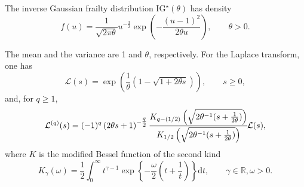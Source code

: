 The inverse Gaussian frailty distribution $\mathrm{IG}^\star(\theta)$ has density
\begin{equation*} 
  f(u) = \frac1{\sqrt{2 \pi \theta}} u^{- \tfrac32} \exp \left( - \frac{(u-1)^2}{2 \theta u}  \right),
  \qquad \theta > 0.
\end{equation*}

The mean and the variance are 1 and $\theta$, respectively.
For the Laplace transform, one has
\begin{equation*}
  \mathcal L(s) = \exp \left( \frac1\theta \left(1  - \sqrt{1 + 2\theta s} \right) \right),
  \qquad s\ge 0,
\end{equation*}
and, for $q \geq 1$,
\begin{equation}
\mathcal{L}^{(q)} ( s ) = ( - 1 )^{q}  \left( 2 \theta s + 1 \right)^{- \tfrac{q}{2}}
  \cfrac{K_{q - (1 \slash 2)} \left( \sqrt{2 \theta^{-1} ( s + \tfrac{1}{2 \theta} )} \right)}{K_{1 \slash 2} \left( \sqrt{2 \theta^{-1} ( s + \tfrac{1}{2 \theta} )} \right)} 
  \mathcal{L} ( s ),
\label{eq:invGauss}   
\end{equation}
where $K$ is the modified Bessel function of the second kind \cite[Section A.4.2]{Hougaard00}
\begin{equation*}
  K_\gamma(\omega) = \frac12 \int_0^\infty t^{\gamma-1} \exp\left\{ -\frac\omega2 \left(t+\frac1t \right) \right\}
    \mathrm d t,
    \qquad \gamma\in\mathbb R, \omega > 0.
\end{equation*}


